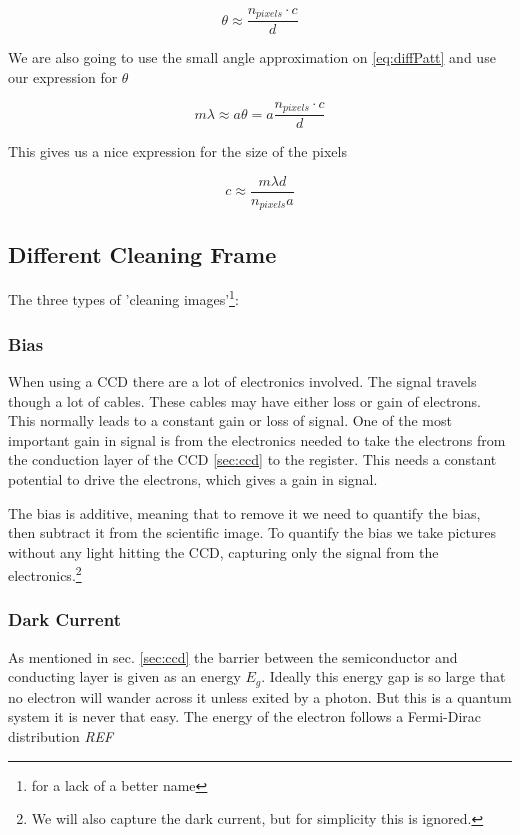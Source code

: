 \documentclass{emulateapj}
\begin{document}
\begin{equation}
\theta \approx \frac{n_{pixels}\cdot c}{d}
\end{equation}

We are also going to use the small angle approximation on \eqref{eq:diffPatt} and use our expression for $\theta$

\begin{equation}
m\lambda \approx a\theta = a\frac{n_{pixels}\cdot c}{d}
\end{equation}

This gives us a nice expression for the size of the pixels

\begin{equation}
c \approx \frac{m\lambda d}{n_{pixels}a}
\label{eq:pixelSize}
\end{equation}


\subsection{Different Cleaning Frame}

The three types of 'cleaning images'\footnote{for a lack of a better name}:

\subsubsection{Bias}
When using a CCD there are a lot of electronics involved. The signal travels though a lot of cables. These cables may have either loss or gain of electrons. This normally leads to a constant gain or loss of signal. One of the most important gain in signal is from the electronics needed to take the electrons from the conduction layer of the CCD \ref{sec:ccd} to the register. This needs a constant potential to drive the electrons, which gives a gain in signal.

The bias is additive, meaning that to remove it we need to quantify  the bias, then subtract it from the scientific image. To quantify the bias we take pictures without any light hitting the CCD, capturing only the signal from the electronics.\footnote{We will also capture the dark current, but for simplicity this is ignored.}

\subsubsection{Dark Current}
As mentioned in sec. \ref{sec:ccd} the barrier between the semiconductor and conducting layer is given as an energy $E_g$. Ideally this energy gap is so large that no electron will wander across it unless exited by a photon. But this is a quantum system it is never that easy. The energy of the electron follows a Fermi-Dirac distribution \emph{REF}
\end{document}
